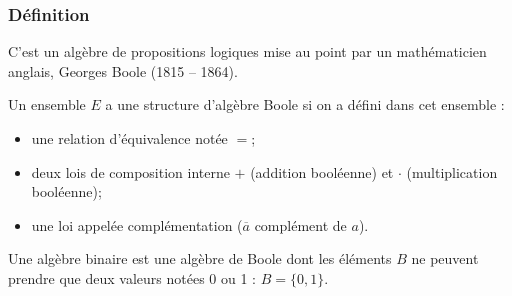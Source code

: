 \documentclass[11pt,oneside]{article}
\begin{document}
\subsubsection{Définition}
C'est un algèbre de propositions logiques mise au point par un mathématicien anglais, Georges Boole (1815 -- 1864).

\begin{defi}
Un ensemble $E$ a une structure d'algèbre Boole si on a défini dans cet ensemble :
\begin{itemize}
\item une relation d'équivalence notée $=$;
\item deux lois de composition interne $+$ (addition booléenne) et $\cdot$ (multiplication booléenne);
\item une loi appelée complémentation ($\overline{a}$ complément de $a$).
\end{itemize}
\end{defi}

Une algèbre binaire est une algèbre de Boole dont les éléments $B$ ne peuvent prendre que deux valeurs notées 0 ou 1 : $B=\{0,1 \}$. 
\end{document}
